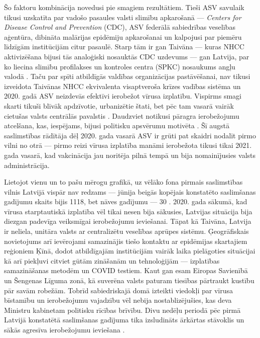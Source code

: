 \documentclass[12pt, a4paper]{article}
\numberwithin{equation}{section} %
\begin{document}
Šo faktoru kombinācija novedusi pie smagiem rezultātiem. Tieši ASV savulaik tikusi uzskatīta par vadošo pasaules valsti slimību apkarošanā --- \textit{Centers for Disease Control and Prevention} (CDC), ASV federālā sabiedrības veselības aģentūra, dibināta malārijas epidēmiju apkarošanai \cite{parascandola1996mcwa} un kalpojusi par piemēru līdzīgām institūcijām citur pasaulē. Starp tām ir gan Taivāna --- kuras NHCC aktivizēšana bijusi tās analoģiski nosauktās CDC uzdevums \cite{wang2020response} --- gan Latvija, par ko liecina slimību profilakses un kontroles centra (SPKC) nosaukums angļu valodā \cite{spkc_lv}. Taču par spīti atbildīgās valdības organizācijas pastāvēšanai, nav tikusi izveidota Taivānas NHCC ekvivalenta visaptveroša krīzes vadības sistēma un 2020. gadā ASV neizdevās efektīvi ierobežot vīrusa izplatību. Vispirms smagi skarti tikuši blīvāk apdzīvotie, urbanizētie štati, bet pēc tam vasarā vairāk cietušas valsts centrālās pavalstis \cite{us_stats}. Daudzviet notikusi pāragra ierobežojumu atcelšana, kas, iespējams, bijusi politisku apsvērumu motivēta \cite{florida_cancel}. Šī augstā saslimstības rādītāja dēļ 2020. gada vasarā ASV ir grūti pat skaidri nodalīt pirmo vilni no otrā --- pirmo reizi vīrusa izplatība manāmi ierobežota tikusi tikai 2021. gada vasarā, kad vakcinācija jau noritēja pilnā tempā un bija nomainījusies valsts administrācija.

Lietojot vienu un to pašu mērogu grafikā, uz vēlāko fona pirmais saslimstības vilnis Latvijā vispār nav redzams --- jūnija beigās kopējais konstatēto saslimšanas gadījumu skaits bijis 1118, bet nāves gadījumu --- 30 \cite{lv_stats}. 2020. gada sākumā, kad vīrusa starptautiskā izplatība vēl tikai nesen bija sākusies, Latvijas situācija bija diezgan padevīga veiksmīgai ierobežojumu ieviešanai. Tāpat kā Taivāna, Latvija ir neliela, unitāra valsts ar centralizētu veselības aprūpes sistēmu. Ģeogrāfiskais novietojums arī ievērojami samazinājis tiešo kontaktu ar epidēmijas skartajiem reģioniem Ķīnā, dodot atbildīgajām institūcijām vairāk laika pielāgoties situācijai kā arī piekļuvi citviet gūtām zināšanām un tehnoloģijām --- izplatības samazināšanas metodēm un COVID testiem. Kaut gan esam Eiropas Savienībā un Šengenas Līguma zonā, kā suverēna valsts paturam tiesības pārtraukt kustību pār savām robežām. Tobrīd sabiedriskajā domā izteikti viedokļi par vīrusa bīstamību un ierobežojumu vajadzību vēl nebija nostablizējušies, kas deva Ministru kabinetam politisku rīcības brīvību. Divu nedēļu periodā pēc pirmā Latvijā konstatētā saslimšanas gadījuma \cite{lv_first_case} tika izsludināts ārkārtas stāvoklis un sākās agresīva ierobežojumu ieviešana \cite{lv_measures}. 
\end{document}
